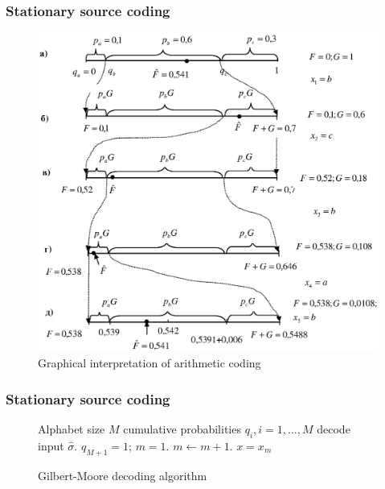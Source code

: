 \documentclass[14pt]{beamer}
\begin{document}
\begin{frame}
\frametitle{Stationary source coding}
\begin{itemize}    

\begin{figure}[htbp]
\begin{minipage}{0.9\linewidth}
\includegraphics[width=1.0\textwidth]{fig2_9.eps}
\caption{Graphical interpretation of arithmetic coding }
\label{AC_graph}
\end{minipage}
\end{figure}


\end{itemize}
\end{frame}



\begin{frame}
\frametitle{Stationary source coding}   

    \begin{center}
    \begin{figure}
    \begin{algorithm}[H]
    \dontprintsemicolon
      \KwIn
      {
       Alphabet size $M$
       cumulative probabilities $q_i, i=1,...,M$\;
       decode input $\hat {\sigma }$.
       }
      \BlankLine
      $q_{M+1}=1$;
      $m = 1$.\;
      \BlankLine
      {
        $m \leftarrow m + 1$.
      }
      \BlankLine
      $x=x_m$
      \end{algorithm}
    \caption{Gilbert-Moore decoding algorithm}
    \label{Alg_dec_GM}
    \end{figure}
    \end{center}
\end{frame}
\end{document}
